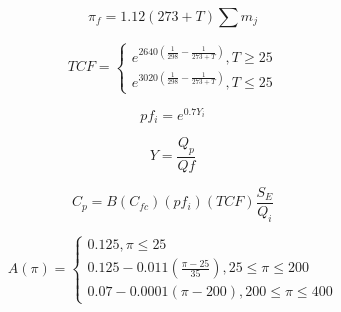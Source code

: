 
\begin{equation}
\label{eq:feedOsmP}
\pi_{f}= 1.12(273+T) \sum m_{j}
\end{equation}

\begin{equation}
\label{eq:TCF}
TCF =
\begin{cases}
e^{2640(\frac{1}{298}- \frac{1}{273+T})} , T\geq25 \\
e^{3020(\frac{1}{298}- \frac{1}{273+T})} , T\leq25
\end{cases}
\end{equation}

\begin{equation}
\label{eq:polfac}
pf_{i} = e^{0.7Y_{i}}
\end{equation}

\begin{equation}
\label{eq:recov}
Y= \frac{Q_{p}}{Q{f}}
\end{equation}

\begin{equation}
\label{eq:permC}
C_{p}=B(C_{fc})({pf_{i}})(TCF)\frac{S_{E}}{Q_{i}}
\end{equation}

\begin{equation}
\label{eq:permability}
A(\pi) =
\begin{cases} 
0.125 , \pi \leq 25 \\
0.125-0.011(\frac{\pi - 25}{35}) , 25 \leq \pi \leq 200 \\ 
0.07-0.0001(\pi-200) , 200 \leq \pi \leq 400  
\end{cases}
\end{equation}

